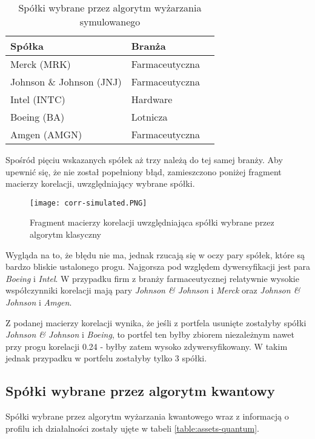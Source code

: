 \documentclass[12pt,a4paper,twoside,openany]{book}
\begin{document}
\begin{table}[h!]
\caption{Spółki wybrane przez algorytm wyżarzania symulowanego}
\label{table:assets-simulated}
\begin{tabularx}{0.8\textwidth} { 
  | >{\raggedright\arraybackslash}X 
  | >{\centering\arraybackslash}X 
  | >{\raggedleft\arraybackslash}X | }
 \hline
 \textbf{Spółka} & \textbf{Branża} \\
 \hline
 Merck (MRK)  & Farmaceutyczna \\
\hline
Johnson \& Johnson (JNJ)  & Farmaceutyczna  \\
\hline
Intel (INTC)  & Hardware \\
\hline
Boeing (BA)  & Lotnicza \\
\hline
Amgen (AMGN)  & Farmaceutyczna \\
\hline
\end{tabularx}
\end{table}



Spośród pięciu wskazanych spółek aż trzy należą do tej samej branży.
Aby upewnić się, że nie został popełniony błąd, zamieszczono poniżej fragment macierzy korelacji, uwzględniający wybrane spółki.


\begin{figure}[H]
\texttt{[image: corr-simulated.PNG]}
\caption{Fragment macierzy korelacji uwzględniająca spółki wybrane przez algorytm klasyczny}
\end{figure}

Wygląda na to, że błędu nie ma, jednak rzucają się w oczy pary spółek, które są bardzo bliskie ustalonego progu.
Najgorsza pod względem dywersyfikacji jest para \textit{Boeing} i \textit{Intel}.
W przypadku firm z branży farmaceutycznej relatywnie wysokie współczynniki korelacji mają pary \textit{Johnson \& Johnson} i \textit{Merck} oraz \textit{Johnson \& Johnson} i \textit{Amgen}.

Z podanej macierzy korelacji wynika, że jeśli z portfela usunięte zostałyby spółki \textit{Johnson \& Johnson} i \textit{Boeing}, to portfel ten byłby zbiorem niezależnym nawet przy progu korelacji 0.24 - byłby zatem wysoko zdywersyfikowany.
W takim jednak przypadku w portfelu zostałyby tylko 3 spółki.

\subsection{Spółki wybrane przez algorytm kwantowy}
Spółki wybrane przez algorytm wyżarzania kwantowego wraz z informacją o profilu ich działalności zostały ujęte w tabeli \ref{table:assets-quantum}.
\end{document}
